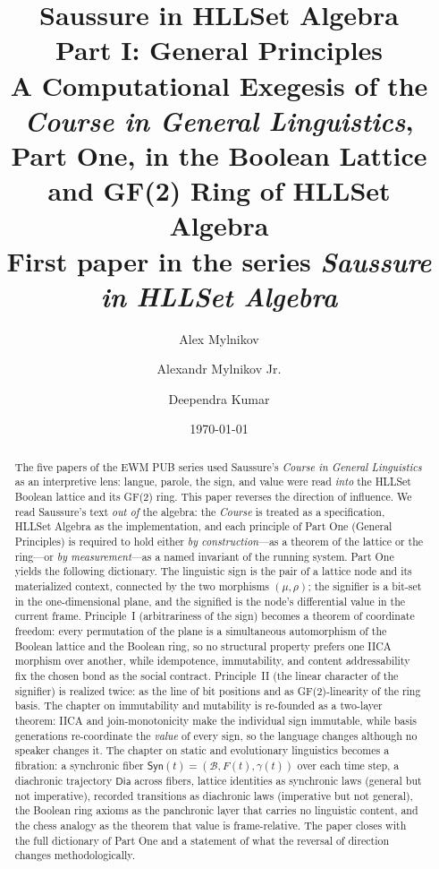 \documentclass[11pt,a4paper]{article}
\title{\textbf{Saussure in HLLSet Algebra}\\[4pt]
\large Part I: General Principles\\[4pt]
\large A Computational Exegesis of the \textit{Course in General Linguistics},\\
Part One, in the Boolean Lattice and GF(2) Ring of HLLSet Algebra\\[6pt]
\normalsize First paper in the series \textit{Saussure in HLLSet Algebra}}
\author{Alex Mylnikov \and Alexandr Mylnikov Jr. \and Deependra Kumar}
\date{\today}
\theoremstyle{remark}
\newcommand{\Lat}{\ensuremath{\mathcal{B}}}              %
\newcommand{\Ing}{\ensuremath{\mu}}                      %
\newcommand{\Mat}{\ensuremath{\rho}}                     %
\newcommand{\Sync}{\ensuremath{\mathsf{Syn}}}            %
\newcommand{\Dia}{\ensuremath{\mathsf{Dia}}}             %
\newcommand{\Gen}{\ensuremath{\gamma}}                   %
\begin{document}
\maketitle

\begin{abstract}
The five papers of the EWM PUB series used Saussure's \textit{Course in General
Linguistics} as an interpretive lens: langue, parole, the sign, and value were
read \emph{into} the HLLSet Boolean lattice and its GF(2) ring. This paper
reverses the direction of influence. We read Saussure's text \emph{out of} the
algebra: the \textit{Course} is treated as a specification, HLLSet Algebra as
the implementation, and each principle of Part One (General Principles) is
required to hold either \emph{by construction}---as a theorem of the lattice or
the ring---or \emph{by measurement}---as a named invariant of the running
system. Part One yields the following dictionary. The linguistic sign is the
pair of a lattice node and its materialized context, connected by the two
morphisms $(\Ing,\Mat)$; the signifier is a bit-set in the one-dimensional
plane, and the signified is the node's differential value in the current frame.
Principle~I (arbitrariness of the sign) becomes a theorem of coordinate
freedom: every permutation of the plane is a simultaneous automorphism of the
Boolean lattice and the Boolean ring, so no structural property prefers one
IICA morphism over another, while idempotence, immutability, and content
addressability fix the chosen bond as the social contract. Principle~II (the
linear character of the signifier) is realized twice: as the line of bit
positions and as GF(2)-linearity of the ring basis. The chapter on immutability
and mutability is re-founded as a two-layer theorem: IICA and join-monotonicity
make the individual sign immutable, while basis generations re-coordinate the
\emph{value} of every sign, so the language changes although no speaker changes
it. The chapter on static and evolutionary linguistics becomes a fibration:
a synchronic fiber $\Sync(t)=(\Lat,F(t),\Gen(t))$ over each time step, a
diachronic trajectory $\Dia$ across fibers, lattice identities as synchronic
laws (general but not imperative), recorded transitions as diachronic laws
(imperative but not general), the Boolean ring axioms as the panchronic layer
that carries no linguistic content, and the chess analogy as the theorem that
value is frame-relative. The paper closes with the full dictionary of Part One
and a statement of what the reversal of direction changes methodologically.
\end{abstract}
\end{document}
